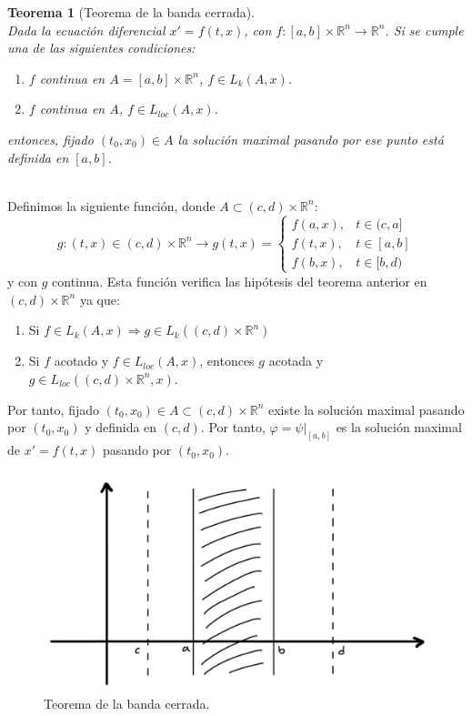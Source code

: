 \documentclass[11pt, a4paper,twoside]{article}
\makeatletter
\theoremstyle{theorem-style}  %
\newtheorem{theorem}{Teorema}[section]  %
\renewenvironment{proof}[1][\proofname]{\par
	\pushQED{\qed}%
	\normalfont \topsep6\p@\@plus6\p@\relax
	\list{}{%
		\settowidth{\leftmargin}{\quad:\hskip\labelsep}%
		\setlength{\labelwidth}{0pt}%
		\setlength{\itemindent}{-\leftmargin}%
	}%
	\item[\hskip\labelsep\itshape#1\@addpunct{:}]\ignorespaces
}{%
	\popQED\endlist\@endpefalse
}
\theoremstyle{definition-style}
\theoremstyle{example-style}
\makeatother
\begin{document}
\begin{theorem}[Teorema de la banda cerrada] \label{bandacerrada} \ \\
	Dada la ecuación diferencial $x' = f(t, x)$, con $f: [a, b] \times \mathbb{R}^n \longrightarrow \mathbb{R}^n$. Si se cumple una de las siguientes condiciones:
	\begin{enumerate}
		\item $f$ continua en $A = [a, b] \times \mathbb{R}^n$, $f \in L_k (A, x)$.
		\item $f$ continua en $A$, $f \in L_{loc} (A, x)$.
	\end{enumerate}
	entonces, fijado $(t_0, x_0) \in A$ la solución maximal pasando por ese punto está definida en $[a, b]$. 
\end{theorem}
\begin{proof}\ \\
	Definimos la siguiente función, donde $A \subset (c, d) \times \mathbb{R}^n$:
	\[g: (t, x) \in (c, d) \times \mathbb{R}^n \longrightarrow g(t, x) = \begin{cases}
	f(a, x), &t \in (c, a] \\
	f(t, x), &t \in [a, b] \\
	f(b, x), &t \in [b, d)
	\end{cases}\]
	y con $g$ continua. Esta función verifica las hipótesis del teorema anterior en $(c, d) \times \mathbb{R}^n$ ya que:
	\begin{enumerate}[-]
		\item Si $f \in L_k(A, x) \Rightarrow g \in L_k ((c, d) \times \mathbb{R}^n)$
		\item Si $f$ acotado y $f \in L_{loc} (A, x)$, entonces $g$ acotada y $g \in L_{loc} ((c, d) \times \mathbb{R}^n, x)$.
	\end{enumerate}
	Por tanto, fijado $(t_0, x_0) \in A \subset (c, d) \times \mathbb{R}^n$ existe la solución maximal pasando por $(t_0, x_0)$ y definida en $(c, d)$. Por tanto, $\varphi = \psi|_{[a, b]}$ es la solución maximal de $x' = f(t, x)$ pasando por $(t_0, x_0)$.
	
	\begin{figure}[h]
		\centering
		\includegraphics[scale=0.3]{banda_cerrada}
		\caption{Teorema de la banda cerrada.}
	\end{figure}
	\end{proof}
\end{document}
